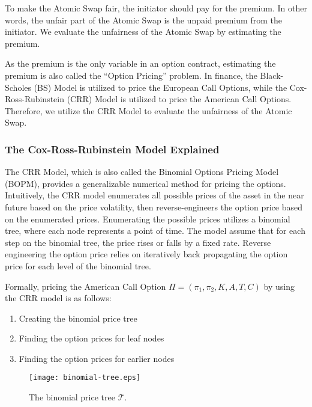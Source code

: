 To make the Atomic Swap fair, the initiator should pay for the premium.
In other words, the unfair part of the Atomic Swap is the unpaid premium from the initiator.
We evaluate the unfairness of the Atomic Swap by estimating the premium.

As the premium is the only variable in an option contract, estimating the premium is also called the ``Option Pricing'' problem.
In finance, the Black-Scholes (BS) Model is utilized to price the European Call Options,
while the Cox-Ross-Rubinstein (CRR) Model is utilized to price the American Call Options.
Therefore, we utilize the CRR Model to evaluate the unfairness of the Atomic Swap.

\subsubsection{The Cox-Ross-Rubinstein Model Explained}

The CRR Model, which is also called the Binomial Options Pricing Model (BOPM), provides a generalizable numerical method for pricing the options.
Intuitively, the CRR model enumerates all possible prices of the asset in the near future based on the price volatility,
then reverse-engineers the option price based on the enumerated prices.
Enumerating the possible prices utilizes a binomial tree, where each node represents a point of time.
The model assume that for each step on the binomial tree, the price rises or falls by a fixed rate.
Reverse engineering the option price relies on iteratively back propagating the option price for each level of the binomial tree.

Formally, pricing the American Call Option $\Pi = (\pi_1, \pi_2, K, A, T, C)$ by using the CRR model is as follows:

\begin{enumerate}
    \item Creating the binomial price tree
    \item Finding the option prices for leaf nodes
    \item Finding the option prices for earlier nodes 
\end{enumerate}


\begin{figure}
    \centering
    \texttt{[image: binomial-tree.eps]}
    \caption{The binomial price tree $\mathcal{T}$.}
    \label{fig:binomial_tree}
\end{figure}

